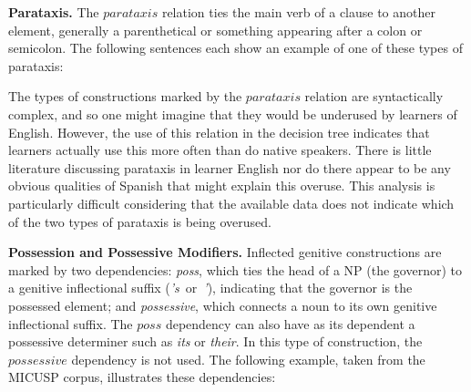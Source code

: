 \documentclass[main.tex]{subfiles}
\begin{document}

\textbf{Parataxis.} The $parataxis$ relation ties the main verb of a clause to another element, generally a parenthetical or something appearing after a colon or semicolon. The following sentences \citep[p. 921]{typed-deps-manual,quirk:1985} each show an example of one of these types of parataxis:

The types of constructions marked by the $parataxis$ relation are syntactically complex, and so one might imagine that they would be underused by learners of English. However, the use of this relation in the decision tree indicates that learners actually use this more often than do native speakers. There is little literature discussing parataxis in learner English nor do there appear to be any obvious qualities of Spanish that might explain this overuse. This analysis is particularly difficult considering that the available data does not indicate which of the two types of parataxis is being overused.


\textbf{Possession and Possessive Modifiers.} Inflected genitive constructions are marked by two dependencies: \textit{poss}, which ties the head of a NP (the governor) to a genitive inflectional suffix (\textit{'s}~or~\textit{'}), indicating that the governor is the possessed element; and \textit{possessive}, which connects a noun to its own genitive inflectional suffix. The $poss$ dependency can also have as its dependent a possessive determiner such as \textit{its} or \textit{their}. In this type of construction, the $possessive$ dependency is not used. The following example, taken from the MICUSP corpus, illustrates these dependencies:
\end{document}
